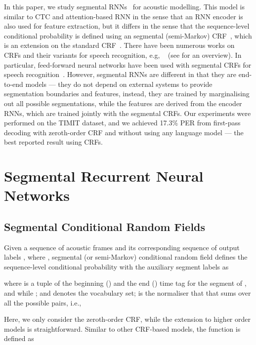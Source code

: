 \documentclass[a4paper]{article}
\begin{document}
In this paper, we study segmental RNNs~\cite{kong2015segmental} for acoustic modelling. This model is similar to CTC and attention-based RNN in the sense that an RNN encoder is also used for feature extraction, but it differs in the sense that the sequence-level conditional probability is defined using an segmental (semi-Markov) CRF~\cite{sarawagi2004semi}, which is an extension on the standard CRF~\cite{lafferty2001conditional}. There have been numerous works on CRFs and their variants for speech recognition, e.g, ~\cite{gunawardana2005hidden, hifny2009speech, zweig2011speech} (see \cite{fosler2013conditional} for an overview). In particular, feed-forward neural networks have been used with segmental CRFs for speech recognition~\cite{abdel2013deep, he2015segmental}. However, segmental RNNs are different in that they are end-to-end models --- they do not depend on external systems to provide segmentation boundaries and features, instead, they are trained by marginalising out all possible segmentations, while the features are derived from the encoder RNNs, which are trained jointly with the segmental CRFs. Our experiments were performed on the TIMIT dataset, and we achieved 17.3\% PER from first-pass decoding with zeroth-order CRF and without using any language model --- the best reported result using CRFs. 
 




\section{Segmental Recurrent Neural Networks}



\subsection{Segmental Conditional Random Fields}

Given a sequence of acoustic frames  and its corresponding sequence of output labels , where , segmental (or semi-Markov) conditional random field defines the sequence-level conditional probability with the auxiliary segment labels  as

where  is a tuple of the beginning () and the end () time tag for the segment of , and  while ;  and  denotes the vocabulary set;  is the normaliser that that sums over all the possible  pairs, i.e.,

Here, we only consider the zeroth-order CRF, while the extension to higher order models is straightforward. Similar to other CRF-based models, the function  is defined as
\end{document}
